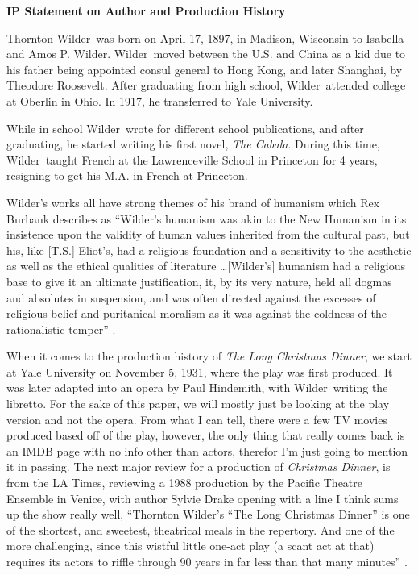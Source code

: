 \documentclass[12pt]{article}
\def\tw{Thornton Wilder}
\def\w{Wilder}
\begin{document}
\begin{doublespace}
\vspace*{20pt}
    \begin{center}
        \textbf{\large{IP Statement on Author and Production History}}
    \end{center}
    \par \tw\ was born on April 17, 1897, in Madison, Wisconsin to Isabella and Amos P. Wilder.
    \w\ moved between the U.S. and China as a kid due to his father being appointed consul general to Hong Kong, and later Shanghai, by Theodore Roosevelt.
    After graduating from high school, \w\ attended college at Oberlin in Ohio. In 1917, he transferred to Yale University.
    \par While in school \w\ wrote for different school publications, and after graduating, he started writing his first novel, \textit{The Cabala}.
    During this time, \w\ taught French at the Lawrenceville School in Princeton for 4 years, resigning to get his M.A. in French at Princeton.
    \par \w's works all have strong themes of his brand of humanism which Rex Burbank describes as 
    ``Wilder's humanism was akin to the New Humanism in its insistence upon the validity of human values inherited from the cultural past, but his, like [T.S.] Eliot's, had a religious foundation and a sensitivity to the aesthetic as well as the ethical qualities of literature
    \dots [Wilder's] humanism had a religious base to give it an ultimate justification, it, by its very nature, held all dogmas and absolutes in suspension, and was often directed against the excesses of religious belief and puritanical moralism as it was against the coldness of the rationalistic temper'' \autocite*[29]{Thorton}.
    \par When it comes to the production history of \textit{The Long Christmas Dinner}, we start at Yale University on November 5, 1931, where the play was first produced.
    It was later adapted into an opera by Paul Hindemith, with \w\ writing the libretto. For the sake of this paper, we will mostly just be looking at the play version and not the opera.
    From what I can tell, there were a few TV movies produced based off of the play, however, the only thing that really comes back is an IMDB page with no info other than actors, therefor I'm just going to mention it in passing.
    The next major review for a production of \textit{Christmas Dinner}, is from the LA Times, reviewing a 1988 production by the Pacific Theatre Ensemble in Venice, with author Sylvie Drake opening with a line I think sums up the show really well, ``\tw's ``The Long Christmas Dinner'' is one of the shortest, and sweetest, theatrical meals in the repertory. And one of the more challenging, since this wistful little one-act play (a scant act at that) requires its actors to riffle through 90 years in far less than that many minutes'' \autocite{LA_times}.

\end{doublespace}
\end{document}
